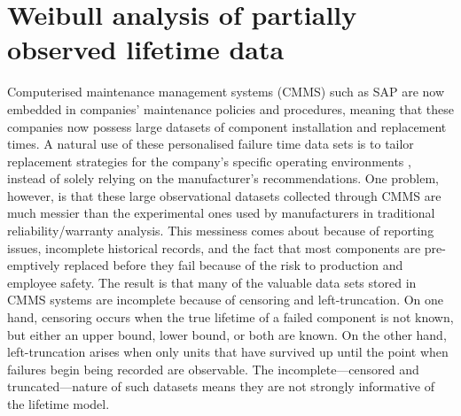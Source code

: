 \chapter{Weibull analysis of partially observed lifetime data} \label{chap:chapter2}

Computerised maintenance management systems (CMMS) such as SAP \citep{sap} are now embedded in companies' maintenance policies and procedures, meaning that these companies now possess large datasets of component installation and replacement times. A natural use of these personalised failure time data sets is to tailor replacement strategies for the company's specific operating environments \citep[p.~13]{Meeker2022}, instead of solely relying on the manufacturer's recommendations. One problem, however, is that these large observational datasets collected through CMMS are much messier than the experimental ones used by manufacturers in traditional reliability/warranty analysis. This messiness comes about because of reporting issues, incomplete historical records, and the fact that most components are pre-emptively replaced before they fail because of the risk to production and employee safety. The result is that many of the valuable data sets stored in CMMS systems are incomplete because of censoring and left-truncation. On one hand, censoring occurs when the true lifetime of a failed component is not known, but either an upper bound, lower bound, or both are known. On the other hand, left-truncation arises when only units that have survived up until the point when failures begin being recorded are observable. The incomplete---censored and truncated---nature of such datasets means they are not strongly informative of the lifetime model.

